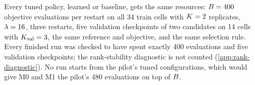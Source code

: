 Every tuned policy, learned or baseline, gets the same resources: $B = 400$ objective
evaluations per restart on all 34 train cells with $K = 2$ replicates, $\lambda = 16$, three
restarts, five validation checkpoints of two candidates on 14 cells with $K_{\mathrm{val}} = 3$, the same
reference and objective, and the same selection rule. Every finished run was checked to have spent
exactly 400 evaluations and five validation checkpoints; the rank-stability diagnostic is not
counted (\cref{app:rank-diagnostic}). No run starts from the pilot's tuned configurations, which
would give M0 and M1 the pilot's 480 evaluations on top of $B$.

